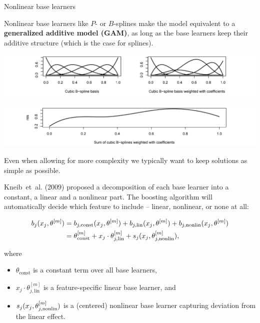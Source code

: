 \begin{vbframe}{Nonlinear base learners}

Nonlinear base learners like $P$- or $B$-splines make the model equivalent to a
\textbf{generalized additive model (GAM)}, as long as the base learners keep 
their additive structure (which is the case for splines).
\vspace{0.5cm}

\vfill

\begin{center}
\includegraphics[width=1\textwidth]{figure_man/NBL01.png}
\end{center}

\vfill

\begin{center}
\includegraphics[width=1\textwidth]{figure_man/NBL02.png}
\end{center}

\framebreak


Even when allowing for more complexity we typically want to keep solutions as 
simple as possible.

\lz

Kneib~et~al. (2009) proposed a decomposition of each base learner into a 
constant, a linear and a nonlinear part. 
The boosting algorithm will automatically decide which feature to include -- 
linear, nonlinear, or none at all:

\vspace{-0.5cm}

\begin{align*}
b_j(x_j, \theta^{[m]}) & = b_{j, \text{const}}(x_j, \theta^{[m]}) + b_{j, \text{lin}}
(x_j, \theta^{[m]}) + b_{j, \text{nonlin}}(x_j, \theta^{[m]})\\
 & = \theta^{[m]}_\text{const} + x_j \cdot \theta^{[m]}_{j, \text{lin}} + 
 s_j(x_j, \theta^{[m]}_{j,\text{nonlin}}),
\end{align*}

\small
where
\begin{itemize}
  \small
  \item $\theta_\text{const}$ is a constant term over all base learners,
  \item $x_j \cdot \theta^{[m]}_{j, \text{lin}}$ is a feature-specific linear 
  base learner, and
  \item $s_j(x_j, \theta^{[m]}_{j,\text{nonlin}})$ is a (centered) nonlinear base 
  learner capturing deviation from the linear effect.
\end{itemize}

\end{vbframe}

